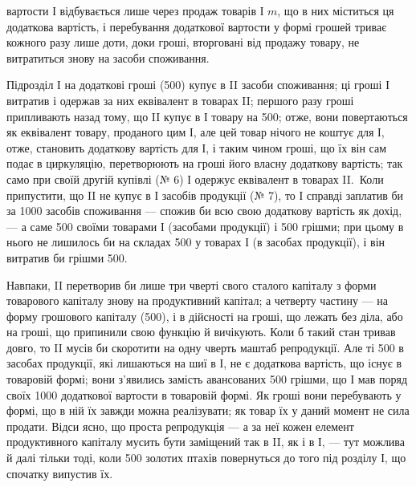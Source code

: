 \parcont{}  %
вартости І відбувається лише через продаж товарів І $m$, що в них
міститься ця додаткова вартість, і перебування додаткової вартости у
формі грошей триває кожного разу лише доти, доки гроші, вторговані
від продажу товару, не витратиться знову на засоби споживання.

Підрозділ І на додаткові гроші (500) купує в II засоби
споживання; ці гроші І витратив і одержав за них еквівалент в товарах II;
першого разу гроші припливають назад тому, що II купує в І товару
на 500; отже, вони повертаються як еквівалент товару, проданого
цим І, але цей товар нічого не коштує для І, отже, становить додаткову
вартість для І, і таким чином гроші, що їх він сам
подає в циркуляцію, перетворюють на гроші його
власну додаткову вартість; так само при своїй другій купівлі
(№ 6) І одержує еквівалент в товарах II.~Коли припустити, що II не
купує в І засобів продукції (№ 7), то І справді заплатив би за 1000 засобів споживання — спожив би всю свою додаткову вартість як
дохід, — а саме 500 своїми товарами І (засобами продукції) і 500 грішми;
при цьому в нього не лишилось би на складах 500 у товарах І
(в засобах продукції), і він витратив би грішми 500.

Навпаки, II перетворив би лише три чверті свого сталого капіталу
з форми товарового капіталу знову на продуктивний капітал; а четверту
частину — на форму грошового капіталу (500), і в дійсності на
гроші, що лежать без діла, або на гроші, що припинили свою функцію
й вичікують. Коли б такий стан тривав довго, то II мусів би скоротити
на одну чверть маштаб репродукції. Але ті 500 в засобах продукції,
які лишаються на шиї в І, не є додаткова вартість, що існує в товаровій
формі; вони з’явились замість авансованих 500 грішми, що І мав
поряд своїх 1000 додаткової вартости в товаровій формі. Як
гроші вони перебувають у формі, що в ній їх завжди можна реалізувати;
як товар їх у даний момент не сила продати. Відси ясно, що проста
репродукція — а за неї кожен елемент продуктивного капіталу мусить бути
заміщений так в II, як і в І, — тут можлива й далі тільки тоді, коли 500 золотих
птахів повернуться до того під розділу І, що спочатку випустив їх.

